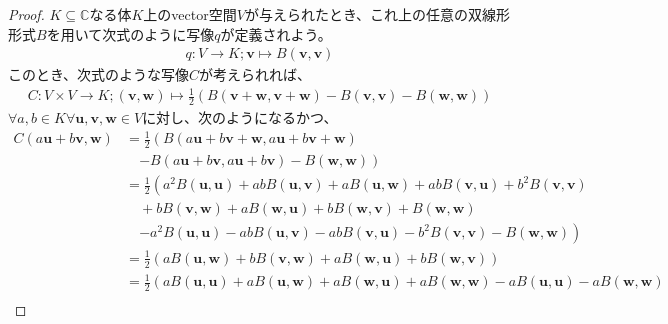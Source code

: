 \documentclass[dvipdfmx]{jsarticle}
\begin{document}
\begin{proof}
$K \subseteq \mathbb{C}$なる体$K$上のvector空間$V$が与えられたとき、これ上の任意の双線形形式$B$を用いて次式のように写像$q$が定義されよう。
\begin{align*}
q:V \rightarrow K;\mathbf{v} \mapsto B\left( \mathbf{v},\mathbf{v} \right)
\end{align*}
このとき、次式のような写像$C$が考えられれば、
\begin{align*}
C:V \times V \rightarrow K;\left( \mathbf{v},\mathbf{w} \right) \mapsto \frac{1}{2}\left( B\left( \mathbf{v} + \mathbf{w},\mathbf{v} + \mathbf{w} \right) - B\left( \mathbf{v},\mathbf{v} \right) - B\left( \mathbf{w},\mathbf{w} \right) \right)
\end{align*}
$\forall a,b \in K\forall\mathbf{u},\mathbf{v},\mathbf{w} \in V$に対し、次のようになるかつ、
\begin{align*}
C\left( a\mathbf{u} + b\mathbf{v},\mathbf{w} \right) &= \frac{1}{2}\left( B\left( a\mathbf{u} + b\mathbf{v} + \mathbf{w},a\mathbf{u} + b\mathbf{v} + \mathbf{w} \right) \right. \\
&\quad \left.- B\left( a\mathbf{u} + b\mathbf{v},a\mathbf{u} + b\mathbf{v} \right) - B\left( \mathbf{w},\mathbf{w} \right) \right)\\
&= \frac{1}{2}\left( a^{2}B\left( \mathbf{u},\mathbf{u} \right) + abB\left( \mathbf{u},\mathbf{v} \right) + aB\left( \mathbf{u},\mathbf{w} \right) + abB\left( \mathbf{v},\mathbf{u} \right) + b^{2}B\left( \mathbf{v},\mathbf{v} \right) \right. \\
&\quad + bB\left( \mathbf{v},\mathbf{w} \right) + aB\left( \mathbf{w},\mathbf{u} \right) + bB\left( \mathbf{w},\mathbf{v} \right) + B\left( \mathbf{w},\mathbf{w} \right) \\
&\quad \left. - a^{2}B\left( \mathbf{u},\mathbf{u} \right) - abB\left( \mathbf{u},\mathbf{v} \right) - abB\left( \mathbf{v},\mathbf{u} \right) - b^{2}B\left( \mathbf{v},\mathbf{v} \right) - B\left( \mathbf{w},\mathbf{w} \right) \right)\\
&= \frac{1}{2}\left( aB\left( \mathbf{u},\mathbf{w} \right) + bB\left( \mathbf{v},\mathbf{w} \right) + aB\left( \mathbf{w},\mathbf{u} \right) + bB\left( \mathbf{w},\mathbf{v} \right) \right)\\
&= \frac{1}{2}\left( aB\left( \mathbf{u},\mathbf{u} \right) + aB\left( \mathbf{u},\mathbf{w} \right) + aB\left( \mathbf{w},\mathbf{u} \right) + aB\left( \mathbf{w},\mathbf{w} \right) - aB\left( \mathbf{u},\mathbf{u} \right) - aB\left( \mathbf{w},\mathbf{w} \right) \right. \\

\end{align*}
\end{proof}
\end{document}
